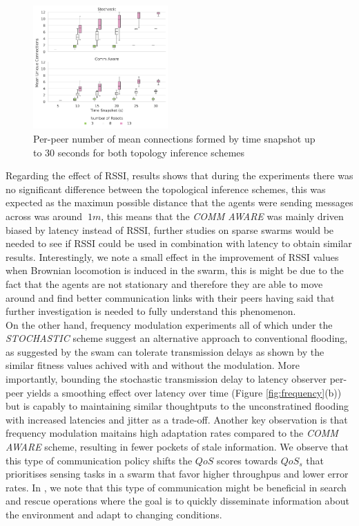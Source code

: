\documentclass[conference]{IEEEtran}
\begin{document}
\begin{figure}[H]
    \centering
    \includegraphics[width=0.46\textwidth]{unique_connections.pdf}
    \caption{Per-peer number of mean connections formed by time snapshot up to 30 seconds for both topology inference schemes}
    \label{fig:unique-connections}
\end{figure}

Regarding the effect of RSSI, results shows that during the experiments there was no significant difference between the topological inference schemes, this was expected as the maximun possible distance that the agents were sending messages across was around $~1m$, this means that the \emph{COMM AWARE} was mainly driven biased by latency instead of RSSI, further studies on sparse swarms would be needed to see if RSSI could be used in combination with latency to obtain similar results. Interestingly, we note a small effect in the improvement of RSSI values when Brownian locomotion is induced in the swarm, this is might be due to the fact that the agents are not stationary and therefore they are able to move around and find better communication links with their peers having said that further investigation is needed to fully understand this phenomenon.\\

On the other hand, frequency modulation experiments all of which under the \emph{STOCHASTIC} scheme suggest an alternative approach to conventional flooding, as suggested by \cite{tsianos_impact_2012} the swam can tolerate transmission delays as shown by the similar fitness values achived with and without the modulation. More importantly, bounding the stochastic transmission delay to latency observer per-peer yields a smoothing effect over latency over time (Figure \ref{fig:frequency}(b)) but is capably to maintaining similar thoughtputs to the unconstratined flooding with increased latencies and jitter as a trade-off. Another key observation is that frequency modulation maitains high adaptation rates compared to the \emph{COMM AWARE} scheme, resulting in fewer pockets of stale information. We observe that this type of communication policy shifts the $QoS$ scores towards $QoS_s$ that prioritises sensing tasks in a swarm that favor higher throughpus and lower error rates. In \cite{perrin_decentralised_2012}, we note that this type of communication might be beneficial in search and rescue operations where the goal is to quickly disseminate information about the environment and adapt to changing conditions.\\
\end{document}
